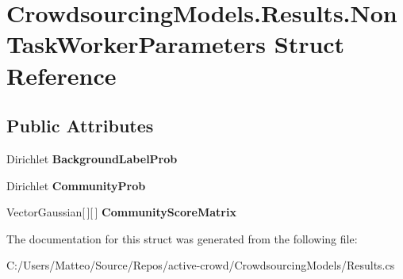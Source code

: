 \hypertarget{struct_crowdsourcing_models_1_1_results_1_1_non_task_worker_parameters}{}\section{Crowdsourcing\+Models.\+Results.\+Non\+Task\+Worker\+Parameters Struct Reference}
\label{struct_crowdsourcing_models_1_1_results_1_1_non_task_worker_parameters}
\subsection*{Public Attributes}
\begin{DoxyCompactItemize}
\item 
\hypertarget{struct_crowdsourcing_models_1_1_results_1_1_non_task_worker_parameters_aeea138db47c40d8de56ff9afe24823cc}{}Dirichlet {\bfseries Background\+Label\+Prob}\label{struct_crowdsourcing_models_1_1_results_1_1_non_task_worker_parameters_aeea138db47c40d8de56ff9afe24823cc}

\item 
\hypertarget{struct_crowdsourcing_models_1_1_results_1_1_non_task_worker_parameters_aead375b5ccbf276f264aacb1faa2b8aa}{}Dirichlet {\bfseries Community\+Prob}\label{struct_crowdsourcing_models_1_1_results_1_1_non_task_worker_parameters_aead375b5ccbf276f264aacb1faa2b8aa}

\item 
\hypertarget{struct_crowdsourcing_models_1_1_results_1_1_non_task_worker_parameters_af38687d971647ce135741f976b7b0ad0}{}Vector\+Gaussian\mbox{[}$\,$\mbox{]}\mbox{[}$\,$\mbox{]} {\bfseries Community\+Score\+Matrix}\label{struct_crowdsourcing_models_1_1_results_1_1_non_task_worker_parameters_af38687d971647ce135741f976b7b0ad0}

\end{DoxyCompactItemize}


The documentation for this struct was generated from the following file\+:\begin{DoxyCompactItemize}
\item 
C\+:/\+Users/\+Matteo/\+Source/\+Repos/active-\/crowd/\+Crowdsourcing\+Models/Results.\+cs\end{DoxyCompactItemize}
